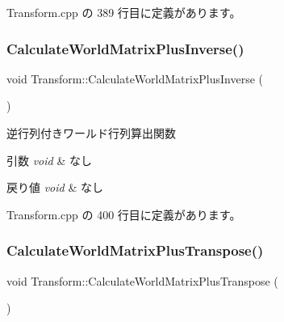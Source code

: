 Transform.\+cpp の 389 行目に定義があります。

\mbox{\label{class_transform_ab12dc73e0dcce2bc8e7129f0affe2775}} 
\subsubsection{\texorpdfstring{Calculate\+World\+Matrix\+Plus\+Inverse()}{CalculateWorldMatrixPlusInverse()}}
{\footnotesize\ttfamily void Transform\+::\+Calculate\+World\+Matrix\+Plus\+Inverse (\begin{DoxyParamCaption}{ }\end{DoxyParamCaption})\hspace{0.3cm}{\ttfamily [private]}}



逆行列付きワールド行列算出関数 


\begin{DoxyParams}{引数}
{\em void} & なし \\
\hline
\end{DoxyParams}

\begin{DoxyRetVals}{戻り値}
{\em void} & なし \\
\hline
\end{DoxyRetVals}


 Transform.\+cpp の 400 行目に定義があります。

\mbox{\label{class_transform_a2f7413dc6aa2d071de0c5842e5351acd}} 
\subsubsection{\texorpdfstring{Calculate\+World\+Matrix\+Plus\+Transpose()}{CalculateWorldMatrixPlusTranspose()}}
{\footnotesize\ttfamily void Transform\+::\+Calculate\+World\+Matrix\+Plus\+Transpose (\begin{DoxyParamCaption}{ }\end{DoxyParamCaption})\hspace{0.3cm}{\ttfamily [private]}}



